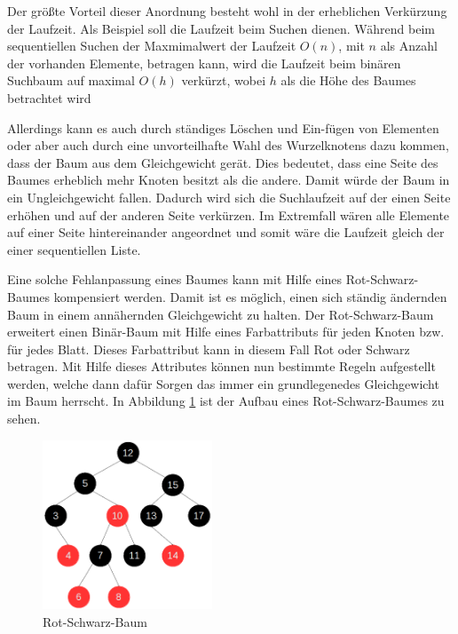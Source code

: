 Der größte Vorteil dieser Anordnung besteht wohl in der erheblichen Verkürzung der Laufzeit. 
Als Beispiel soll die Laufzeit beim Suchen dienen.
Während beim sequentiellen Suchen der Maxmimalwert der Laufzeit $O(n)$, mit $n$ als Anzahl der vorhanden Elemente, betragen kann, wird die Laufzeit beim binären Suchbaum auf maximal $O(h)$ verkürzt, wobei $h$ als die Höhe des Baumes betrachtet wird \cite[S.293]{tcormen}

Allerdings kann es auch durch ständiges Löschen und Ein-fügen von Elementen oder aber auch durch eine unvorteilhafte Wahl des Wurzelknotens dazu kommen, dass der Baum aus dem Gleichgewicht gerät. Dies bedeutet, dass eine Seite des Baumes erheblich mehr Knoten besitzt als die andere. Damit würde der Baum in ein Ungleichgewicht fallen. Dadurch wird sich die Suchlaufzeit auf der einen Seite erhöhen und auf der anderen Seite ver\-kürzen. Im Extremfall wären alle Elemente auf einer Seite hintereinander angeordnet und somit wäre die Laufzeit gleich der einer sequentiellen Liste.

Eine solche Fehlanpassung eines Baumes kann mit Hilfe eines Rot-Schwarz-Baumes kompensiert werden. Damit ist es möglich, einen sich ständig ändernden Baum in einem annähernden Gleichgewicht zu halten. 
Der Rot-Schwarz-Baum erweitert einen Binär-Baum mit Hilfe eines Farbattributs für jeden Knoten bzw. für jedes Blatt. Dieses Farbattribut kann in diesem Fall Rot oder Schwarz betragen. Mit Hilfe dieses Attributes können nun bestimmte Regeln aufgestellt werden, welche dann dafür Sorgen das immer ein grundlegenedes Gleichgewicht im Baum herrscht. In Abbildung \ref{fig:rbtree} ist der Aufbau eines Rot-Schwarz-Baumes zu sehen.

\begin{figure}[h]
	\centering
	\includegraphics[width=0.45\textwidth]{pictures/redblacktree.png}
	\caption{Rot-Schwarz-Baum}
	\label{fig:rbtree}
\end{figure}

